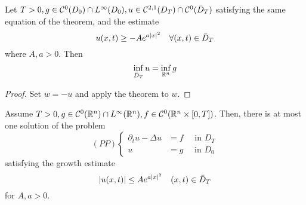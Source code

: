 \begin{PropBox}
    \begin{Cor}[Corollary 1]
        Let $T > 0, g \in \mathcal{C}^0(D_0) \cap L^\infty(D_0), u \in \mathcal{C}^{2,1}(D_T) \cap \mathcal{C}^0(\Bar{D}_T)$ satisfying the same equation of the theorem, and the estimate
        \begin{equation*}
            u(x,t) \geq - A e^{a |x|^2} \quad \forall (x,t) \in \Bar{D}_T
        \end{equation*}
        where $A,a > 0$. Then
        \begin{equation*}
            \inf_{\Bar{D}_T} u = \inf_{\mathbb{R}^n} g
        \end{equation*}
    \end{Cor}
\end{PropBox}
\begin{ProofBox}
    \begin{proof}
        Set $w=-u$ and apply the theorem to $w$.
    \end{proof}
\end{ProofBox}
\begin{PropBox}
    \begin{Cor}
        Assume $T > 0, g \in \mathcal{C}^0(\mathbb{R}^n) \cap L^\infty(\mathbb{R}^n), f \in \mathcal{C}^0(\mathbb{R}^n \times [0,T])$. Then, there is at most one solution of the problem
        \begin{equation*}
        (PP)
            \begin{cases}
                \partial_t u - \Delta u &= f \quad \text{ in } D_T \\
                u &= g \quad \text{ in } D_0
            \end{cases}
        \end{equation*}
        satisfying the growth estimate
        \begin{equation*}
            |u(x,t)| \leq A e^{a |x|^2} \quad (x,t) \in \Bar{D}_T
        \end{equation*}
        for $A,a > 0$. 
    \end{Cor}
\end{PropBox}
